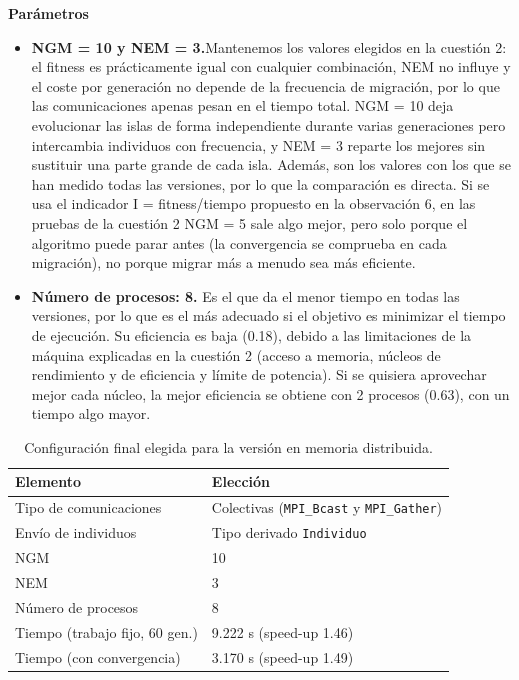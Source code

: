 \documentclass[12pt]{article}
\begin{document}
\begin{enumerate}
\vspace{0.5cm}

\medskip
\noindent\textbf{Parámetros}\par
\smallskip

\begin{itemize}
    \item \textbf{NGM = 10 y NEM = 3.}Mantenemos los valores elegidos en la cuestión 2: el fitness es prácticamente igual con cualquier combinación, NEM no influye y el coste por generación no depende de la frecuencia de migración, por lo que las comunicaciones apenas pesan en el tiempo total. NGM = 10 deja evolucionar las islas de forma independiente durante varias generaciones pero intercambia individuos con frecuencia, y NEM = 3 reparte los mejores sin sustituir una parte grande de cada isla. Además, son los valores con los que se han medido todas las versiones, por lo que la comparación es directa. Si se usa el indicador I = fitness/tiempo propuesto en la observación 6, en las pruebas de la cuestión 2 NGM = 5 sale algo mejor, pero solo porque el algoritmo puede parar antes (la convergencia se comprueba en cada migración), no porque migrar más a menudo sea más eficiente.
    \item \textbf{Número de procesos: 8.} Es el que da el menor tiempo en todas las versiones, por lo que es el más adecuado si el objetivo es minimizar el tiempo de ejecución. Su eficiencia es baja (0.18), debido a las limitaciones de la máquina explicadas en la cuestión 2 (acceso a memoria, núcleos de rendimiento y de eficiencia y límite de potencia). Si se quisiera aprovechar mejor cada núcleo, la mejor eficiencia se obtiene con 2 procesos (0.63), con un tiempo algo mayor.
\end{itemize}

\begin{table}[htbp]
\centering
\begin{tabular}{ll}
\toprule
\textbf{Elemento} & \textbf{Elección} \\
\midrule
Tipo de comunicaciones & Colectivas (\texttt{MPI\_Bcast} y \texttt{MPI\_Gather}) \\
Envío de individuos & Tipo derivado \texttt{Individuo} \\
NGM & 10 \\
NEM & 3 \\
Número de procesos & 8 \\
Tiempo (trabajo fijo, 60 gen.) & 9.222 s (speed-up 1.46) \\
Tiempo (con convergencia) & 3.170 s (speed-up 1.49) \\
\bottomrule
\end{tabular}
\caption{Configuración final elegida para la versión en memoria distribuida.}
\label{tab:c6_final}
\end{table}


\end{enumerate}
\end{document}
